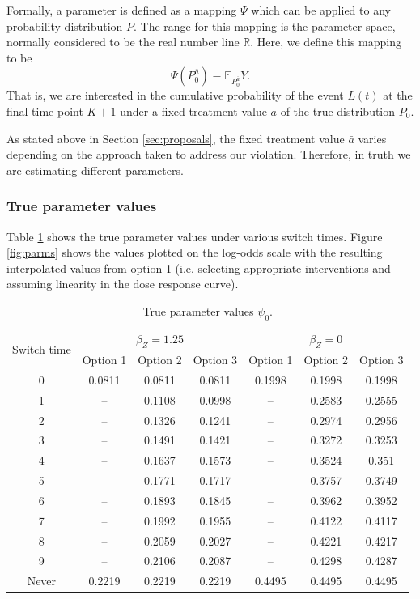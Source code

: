 \documentclass{article}\usepackage[]{graphicx}\usepackage[]{color}
\renewcommand{\indent}{\hskip 20pt}
\begin{document}
\indent Formally, a parameter is defined as a mapping $\Psi$ which can be
applied to any probability distribution $P$. The range for this mapping is
the parameter space, normally considered to be the real number line
$\mathbb{R}$. Here, we define this mapping to be 
\begin{equation}
\Psi(P_0^{\bar{a}}) \equiv  \mathbb{E}_{P_0^{\bar{a}}}Y.
\end{equation}
That is, we are interested in the cumulative probability of the event $L(t)$ at the
final time point $K+1$ under a fixed treatment value $a$ of the true
distribution $P_0$. 
\newline 

As stated above in Section \ref{sec:proposals}, the fixed treatment
value $\bar{a}$ varies depending on the approach taken to address our violation.
Therefore, in truth we are estimating different parameters.  

\subsubsection{True parameter values}
\indent Table \ref{tab:parms} shows the true parameter values under various
switch times. Figure \ref{fig:parms} shows the values plotted on the log-odds scale
with the resulting interpolated values from option 1 (i.e. selecting appropriate
interventions and assuming linearity in the dose response curve).


\begin{table}
\begin{center}
\begin{tabular}{|c||ccc||ccc|}
  \hline
  \multirow{2}{*}{Switch time} &\multicolumn{3}{c||}{$\beta_Z=1.25$}
                &\multicolumn{3}{c|}{$\beta_Z=0$} \\
  \hhline{~------}
  & Option 1	& Option 2	& Option 3 & Option 1	& Option 2	& Option 3 \\
  \hline
  0		&0.0811 &0.0811 &0.0811
        &0.1998 &0.1998 &0.1998 \\
  1		&-- &0.1108 &0.0998 &-- &0.2583 &0.2555 \\
  2		&-- &0.1326 &0.1241 &-- &0.2974 &0.2956 \\
  3		&-- &0.1491 &0.1421 &-- &0.3272 &0.3253 \\
  4		&-- &0.1637 &0.1573 &-- &0.3524 &0.351 \\
  5		&-- &0.1771 &0.1717 &-- &0.3757 &0.3749 \\
  6		&-- &0.1893 &0.1845 &-- &0.3962 &0.3952 \\
  7		&-- &0.1992 &0.1955 &-- &0.4122 &0.4117 \\
  8		&-- &0.2059 &0.2027 &-- &0.4221 &0.4217 \\
  9		&-- &0.2106 &0.2087 &-- &0.4298 &0.4287 \\
  Never &0.2219 &0.2219 &0.2219
        &0.4495 &0.4495 &0.4495 \\
   \hline
\end{tabular}
\caption{True parameter values $\psi_0$.}
\label{tab:parms}
\end{center}
\end{table}
\end{document}
